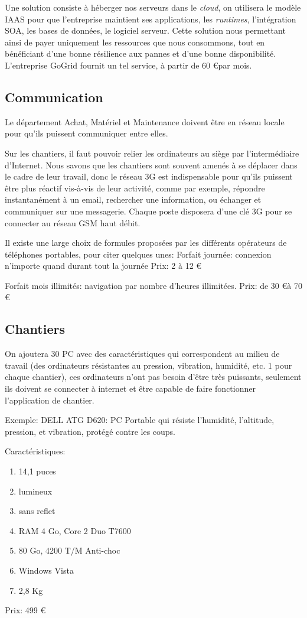 \documentclass [a4paper] {report}
\begin{document}
Une solution consiste à héberger nos serveurs dans le \textsl{cloud}, on utilisera le modèle IAAS pour  que l'entreprise 
maintient ses applications, les {\sl runtimes}, l'intégration SOA, les bases de données, le logiciel serveur.
Cette solution nous permettant ainsi de payer uniquement les ressources que nous consommons, tout en bénéficiant 
d'une bonne résilience aux pannes et d'une bonne disponibilité.
L'entreprise GoGrid fournit un tel service, à partir de 60 \euro par mois.


\subsection{Communication}
Le département Achat, Matériel et Maintenance doivent être en réseau locale pour qu'ils puissent  communiquer entre elles.

Sur les chantiers, il faut pouvoir relier les ordinateurs au siège par l'intermédiaire d'Internet. 
Nous savons que les chantiers
 sont souvent amenés à se déplacer dans le cadre de leur travail, donc le réseau 3G est indispensable 
pour qu'ils puissent être plus réactif vis-à-vis de leur activité, comme par exemple, répondre 
instantanément à un email, rechercher une information, ou échanger et communiquer sur une messagerie. 
Chaque poste disposera d’une clé 3G pour se connecter au réseau GSM haut débit.

Il existe une large choix de formules proposées par les différents opérateurs de téléphones portables, 
pour citer quelques unes:
Forfait journée: connexion n'importe quand durant tout la journée
Prix: 2 à 12 \euro

Forfait mois illimités: navigation par nombre d'heures illimitées.
Prix: de 30 \euro à 70 \euro


   

\subsection{Chantiers}
On ajoutera 30 PC avec des caractéristiques qui correspondent au milieu de travail (des ordinateurs résistantes 
au pression, vibration, humidité, etc. 1 pour chaque chantier), ces ordinateurs n'ont pas besoin d’être très puissants, 
seulement ils doivent se connecter à internet et être capable de faire fonctionner l'application de chantier.

Exemple:
DELL ATG D620: PC Portable qui résiste l'humidité, l'altitude, pression, et vibration, protégé 
contre les coups.
	
	Caractéristiques:

	\begin{enumerate}
		\item 14,1 puces
		\item lumineux
		\item sans reflet
		\item RAM 4 Go, Core 2 Duo T7600
		\item 80 Go, 4200 T/M Anti-choc
		\item Windows Vista
		\item 2,8 Kg
	\end{enumerate}

Prix: 499 \euro
\end{document}
